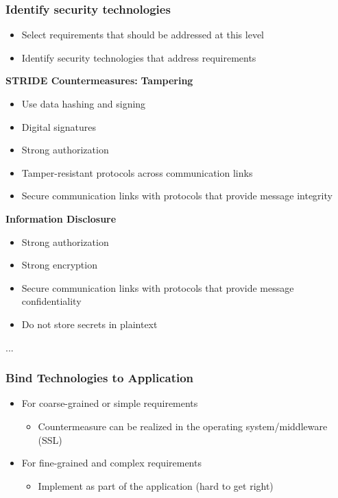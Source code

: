 \subsubsection{Identify security technologies}
\begin{itemize}
    \item Select requirements that should be addressed at this level
    \item Identify security technologies that address requirements
\end{itemize}
\textbf{STRIDE Countermeasures:}
\textbf{Tampering}
\begin{itemize}
    \item Use data hashing and signing
    \item Digital signatures
    \item Strong authorization
    \item Tamper-resistant protocols across communication links
    \item Secure communication links with protocols that provide message integrity
\end{itemize}
\textbf{Information Disclosure}
\begin{itemize}
    \item Strong authorization
    \item Strong encryption
    \item Secure communication links with protocols that provide message confidentiality
    \item Do not store secrets in plaintext
\end{itemize}
...

\subsubsection{Bind Technologies to Application}
\begin{itemize}
    \item For coarse-grained or simple requirements
    \begin{itemize}
        \item Countermeasure can be realized in the operating system/middleware (SSL)
    \end{itemize}
    \item For fine-grained and complex requirements
    \begin{itemize}
        \item Implement as part of the application (hard to get right)
    \end{itemize}
\end{itemize}

